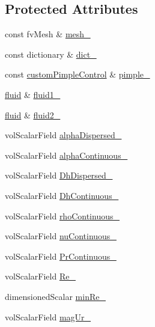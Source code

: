 \subsection*{Protected Attributes}
\begin{DoxyCompactItemize}
\item 
const fv\+Mesh \& \hyperlink{classFoam_1_1FFPair_a23edeeeecebcef11921a33dd5d990570}{mesh\+\_\+}
\item 
const dictionary \& \hyperlink{classFoam_1_1FFPair_a892ddcb9cba6f50b0396cdb7bf1b4f6a}{dict\+\_\+}
\item 
const \hyperlink{classFoam_1_1customPimpleControl}{custom\+Pimple\+Control} \& \hyperlink{classFoam_1_1FFPair_a06f54c6f34cf95f4f0b3d573a196e0c5}{pimple\+\_\+}
\item 
\hyperlink{classFoam_1_1fluid}{fluid} \& \hyperlink{classFoam_1_1FFPair_a158d38ef55cbe9630af49fd955ee9ec4}{fluid1\+\_\+}
\item 
\hyperlink{classFoam_1_1fluid}{fluid} \& \hyperlink{classFoam_1_1FFPair_afcd388bb44accdbfcf63b65301d6e760}{fluid2\+\_\+}
\item 
vol\+Scalar\+Field \hyperlink{classFoam_1_1FFPair_a892915169074a37515b3c4c0a0574d09}{alpha\+Dispersed\+\_\+}
\item 
vol\+Scalar\+Field \hyperlink{classFoam_1_1FFPair_a8cab57656d4ce1683515a4b346305b8e}{alpha\+Continuous\+\_\+}
\item 
vol\+Scalar\+Field \hyperlink{classFoam_1_1FFPair_afc844ca02f252d8d17d331ec95948090}{Dh\+Dispersed\+\_\+}
\item 
vol\+Scalar\+Field \hyperlink{classFoam_1_1FFPair_aa6c7920eb24aa171289eaa178a08fc82}{Dh\+Continuous\+\_\+}
\item 
vol\+Scalar\+Field \hyperlink{classFoam_1_1FFPair_a8838b45dec96fa40f1e5c2b1fd70e992}{rho\+Continuous\+\_\+}
\item 
vol\+Scalar\+Field \hyperlink{classFoam_1_1FFPair_aed6b755795695aaa1e1b951bb91e64a3}{nu\+Continuous\+\_\+}
\item 
vol\+Scalar\+Field \hyperlink{classFoam_1_1FFPair_a77c868b6a02dcc20367195ca1ce867ff}{Pr\+Continuous\+\_\+}
\item 
vol\+Scalar\+Field \hyperlink{classFoam_1_1FFPair_a2df164ac6d2520f15fd568fee117bf4c}{Re\+\_\+}
\item 
dimensioned\+Scalar \hyperlink{classFoam_1_1FFPair_acdbfe9f74a4cd0f0ed5c075bfacda710}{min\+Re\+\_\+}
\item 
vol\+Scalar\+Field \hyperlink{classFoam_1_1FFPair_af53209c544b0364488260bf04f418372}{mag\+Ur\+\_\+}

\end{DoxyCompactItemize}
